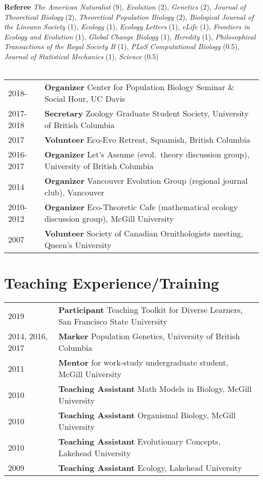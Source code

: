 \documentclass[12pt]{article}
\begin{document}
\noindent \textbf{Referee} \textit{The American Naturalist} (9), \textit{Evolution} (2), \textit{Genetics} (2), \textit{Journal of Theoretical Biology} (2), \textit{Theoretical Population Biology} (2), \textit{Biological Journal of the Lineann Society} (1), \textit{Ecology} (1), \textit{Ecology Letters} (1), \textit{eLife} (1), \textit{Frontiers in Ecology and Evolution} (1), \textit{Global Change Biology} (1), \textit{Heredity} (1), \textit{Philosophical Transactions of the Royal Society B} (1), \textit{PLoS Computational Biology} (0.5), \textit{Journal of Statistical Mechanics} (1), \textit{Science} (0.5) \\\\
\begin{tabular}{ll}
2018- & \textbf{Organizer} Center for Population Biology Seminar \& Social Hour, UC Davis \\
2017-2018 & \textbf{Secretary} Zoology Graduate Student Society, University of British Columbia \\
2017 & \textbf{Volunteer} Eco-Evo Retreat, Squamish, British Columbia \\
2016-2017 & \textbf{Organizer} Let's Assume (evol.\ theory discussion group), University of British Columbia \\
2014 & \textbf{Organizer} Vancouver Evolution Group (regional journal club), Vancouver \\
2010-2012 & \textbf{Organizer} Eco-Theoretic Cafe (mathematical ecology discussion group), McGill University \\
2007 & \textbf{Volunteer} Society of Canadian Ornithologists meeting,  Queen's University
\end{tabular}

\section*{Teaching Experience/Training}

\begin{tabular}{ll}
2019 & \textbf{Participant} Teaching Toolkit for Diverse Learners, San Francisco State University\\ 
2014, 2016, 2017 & \textbf{Marker} Population Genetics, University of British Columbia \\
2011 & \textbf{Mentor} for work-study undergraduate student, McGill University \\
2010 & \textbf{Teaching Assistant} Math Models in Biology, McGill University \\
2010 & \textbf{Teaching Assistant} Organismal Biology, McGill University\\
2010 &  \textbf{Teaching Assistant} Evolutionary Concepts, Lakehead University\\
2009 &  \textbf{Teaching Assistant} Ecology, Lakehead University
\end{tabular}
\end{document}

